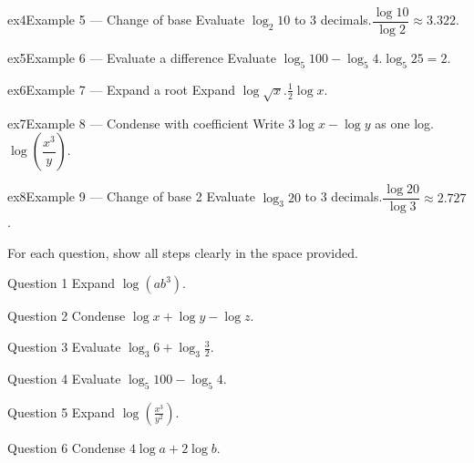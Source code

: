 \documentclass[11pt]{article}
\begin{document}
\begin{example}{ex4}{Example 5 --- Change of base}
Evaluate $\log_2 10$ to 3 decimals.\soln $\dfrac{\log 10}{\log 2}\approx3.322$.
\end{example}

\begin{example}{ex5}{Example 6 --- Evaluate a difference}
Evaluate $\log_5 100-\log_5 4$.\soln $\log_5 25=2$.
\end{example}

\begin{example}{ex6}{Example 7 --- Expand a root}
Expand $\log\sqrt{x}$.\soln $\tfrac12\log x$.
\end{example}

\begin{example}{ex7}{Example 8 --- Condense with coefficient}
Write $3\log x-\log y$ as one log.\soln $\log\!\left(\dfrac{x^3}{y}\right)$.
\end{example}

\begin{example}{ex8}{Example 9 --- Change of base 2}
Evaluate $\log_3 20$ to 3 decimals.\soln $\dfrac{\log 20}{\log 3}\approx2.727$.
\end{example}

\clearpage
{}
For each question, show all steps clearly in the space provided.

\begin{qbox}{Question 1}
Expand $\log(ab^3)$.\workspace{2.4cm}
\end{qbox}

\begin{qbox}{Question 2}
Condense $\log x+\log y-\log z$.\workspace{2.4cm}
\end{qbox}

\begin{qbox}{Question 3}
Evaluate $\log_3 6+\log_3 \tfrac32$.\workspace{2.4cm}
\end{qbox}

\begin{qbox}{Question 4}
Evaluate $\log_5 100-\log_5 4$.\workspace{2.4cm}
\end{qbox}

\begin{qbox}{Question 5}
Expand $\log\!\left(\tfrac{x^3}{y^2}\right)$.\workspace{2.4cm}
\end{qbox}

\begin{qbox}{Question 6}
Condense $4\log a+2\log b$.\workspace{2.4cm}
\end{qbox}
\end{document}
